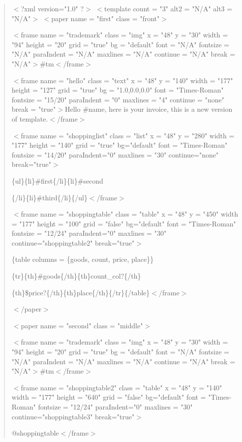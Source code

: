 \documentclass[12pt,twoside,a4paper]{report}
\begin{document}
\begin{quote}

$<$?xml version="1.0" ?$>$
$<$template count = "3" alt2 = "N/A" alt3 = "N/A"$>$
$<$paper name = "first" class = "front"$>$

  $<$frame name = "trademark" class = "img" x = "48" y = "30" width = "94" height = "20" grid = "true" bg = "default" font = "N/A" fontsize = "N/A" paraIndent = "N/A" maxlines = "N/A" continue = "N/A" break = "N/A"$>$\#tm$<$/frame$>$

  $<$frame name = "hello" class = "text" x = "48" y = "140" width = "177" height = "127" grid = "true" bg = "1.0,0.0,0.0" font = "Times-Roman" fontsize = "15/20" paraIndent = "0" maxlines = "4" continue = "none" break = "true"$>$Hello \#name, here is your invoice, this is a new version of template.$<$/frame$>$

  $<$frame name = "shoppinglist" class = "list" x = "48" y = "280" width = "177" height = "140" grid = "true" bg="default" font = "Times-Roman" fontsize = "14/20" paraIndent="0" maxlines = "30" continue="none" break="true"$>$

\{ul\}\{li\}\#first\{/li\}\{li\}\#second

\{/li\}\{li\}\#third\{/li\}\{/ul\}$<$/frame$>$


  $<$frame name = "shoppingtable" class = "table" x = "48" y = "450" width = "177" height = "100" grid = "false" bg="default" font = "Times-Roman" fontsize = "12/24" paraIndent="0" maxlines = "30" continue="shoppingtable2" break="true"$>$

\{table columns = \{goods, count, price, place\}\}

\{tr\}\{th\}\#goods\{/th\}\{th\}count\_col?\{/th\}

\{th\}\$price?\{/th\}\{th\}place\{/th\}\{/tr\}\{/table\}$<$/frame$>$

$<$/paper$>$

$<$paper name = "second" class = "middle"$>$
  
  $<$frame name = "trademark" class = "img" x = "48" y = "30" width = "94" height = "20" grid = "true" bg = "default" font = "N/A" fontsize = "N/A" paraIndent = "N/A" maxlines = "N/A" continue = "N/A" break = "N/A"$>$\#tm$<$/frame$>$

  $<$frame name = "shoppingtable2" class = "table" x = "48" y = "140" width = "177" height = "640" grid = "false" bg="default" font = "Times-Roman" fontsize = "12/24" paraIndent="0" maxlines = "30" continue="shoppingtable3" break="true"$>$

@shoppingtable$<$/frame$>$


\end{quote}
\end{document}
